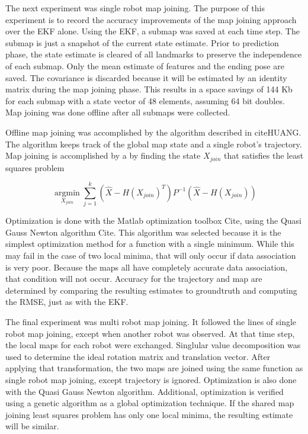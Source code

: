 \documentclass[12pt]{report}
\begin{document}
The next experiment was single robot map joining.  The purpose of this experiment is to record the accuracy improvements of the map joining approach over the EKF alone.  Using the EKF, a submap was saved at each time step.  The submap is just a snapshot of the current state estimate.  Prior to prediction phase, the state estimate is cleared of all landmarks to preserve the independence of each submap.  Only the mean estimate of features and the ending pose are saved.  The covariance is discarded because it will be estimated by an identity matrix during the map joining phase.  This results in a space savings of 144 Kb for each submap with a state vector of 48 elements, assuming 64 bit doubles.  Map joining was done offline after all submaps were collected. 

Offline map joining was accomplished by the algorithm described in cite{HUANG}.  The algorithm keeps track of the global map state and a single robot's trajectory.  Map joining is accomplished by a by finding the state $X_{join}$ that satisfies the least squares problem 

\begin{equation}
\underset{X_{join}}{\operatorname{argmin}}  \sum \limits_{j=1}^k (\hat{X} - H(X_{join})^T) P^{-1} (\hat{X} - H(X_{join}))
\end{equation}

Optimization is done with the Matlab optimization toolbox {Cite}, using the Quasi Gauss Newton algorithm {Cite}.  This algorithm was selected because it is the simplest optimization method for a function with a single minimum.  While this may fail in the case of two local minima, that will only occur if data association is very poor.  Because the maps all have completely accurate data association, that condition will not occur.  Accuracy for the trajectory and map are determined by comparing the resulting estimates to groundtruth and computing the RMSE, just as with the EKF.

The final experiment was multi robot map joining.  It followed the lines of single robot map joining, except when another robot was observed.  At that time step, the local maps for each robot were exchanged.  Singlular value decomposition was used to determine the ideal rotation matrix and translation vector.  After applying that transformation, the two maps are joined using the same function as single robot map joining, except trajectory is ignored.  Optimization is also done with the Quasi Gauss Newton algorithm.  Additional, optimization is verified using a genetic algorithm as a global optimization technique.  If the shared map joining least squares problem has only one local minima, the resulting estimate will be similar.  
\end{document}
